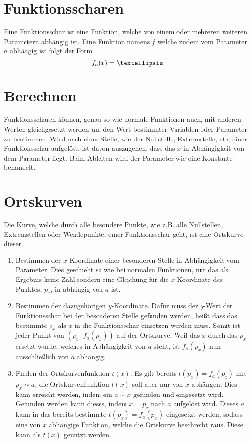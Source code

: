 \documentclass{article}
\begin{document}
 
\section{Funktionsscharen}
Eine Funktionsschar ist eine Funktion, welche von einem oder mehreren weiteren Parametern abhängig ist. Eine Funktion namens $f$ welche zudem vom Parameter $a$ abhängig ist folgt der Form
\[
 f_a(x) = \textellipsis
\] 
 
\section{Berechnen}
Funktionsscharen können, genau so wie normale Funktionen auch, mit anderen Werten gleichgesetzt werden um den Wert bestimmter Variablen oder Parameter zu bestimmen. Wird nach einer Stelle, wie der Nullstelle, Extremstelle, etc, einer Funktionsschar aufgelöst, ist davon auszugehen, dass das $x$ in Abhängigkeit von dem Parameter liegt.   
Beim Ableiten wird der Parameter wie eine Konstante behandelt. 
 
\section{Ortskurven}
Die Kurve, welche durch alle besondere Punkte, wie z.B. alle Nullstellen, Extremstellen oder Wendepunkte, einer Funktionsschar geht, ist eine Ortskurve dieser.
 
\begin{enumerate}
 \item Bestimmen der $x$-Koordinate einer besonderen Stelle in Abhängigkeit vom Parameter. Dies geschieht so wie bei normalen Funktionen, nur das als Ergebnis keine Zahl sondern eine Gleichung für die $x$-Koordinate des Punktes, $p_x$, in abhängig von $a$ ist.
 \item Bestimmen der dazugehörigen $y$-Koordinate. Dafür muss der $y$-Wert der Funktionsschar bei der besonderen Stelle gefunden werden, heißt dass das bestimmte $p_x$ als $x$ in die Funktionsschar einsetzen werden muss. Somit ist jeder Punkt von $(p_x \,|\, f_a(p_x))$ auf der Ortskurve. Weil das $x$ durch das $p_x$ ersetzt wurde, welches in Abhängigkeit von $a$ steht, ist $f_a(p_x)$ nun ausschließlich von $a$ abhängig. 
 \item Finden der Ortskurvenfunktion $t(x)$. Es gilt bereits $t(p_x) = f_a(p_x)$ mit $p_x \sim a$, die Ortskurvenfunktion $t(x)$ soll aber nur von $x$ abhängen. Dies kann erreicht werden, indem ein $a \sim x$ gefunden und eingesetzt wird. Gefunden werden kann dieses, indem $x = p_x$ nach $a$ aufgelöst wird. Dieses $a$ kann in das bereits bestimmte $t(p_x) = f_a(p_x)$ eingesetzt werden, sodass eine von $x$ abhängige Funktion, welche die Ortskurve beschreibt raus. Diese kann als $t(x)$ genutzt werden.
\end{enumerate}  
\end{document}
